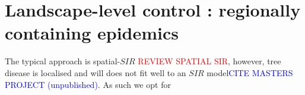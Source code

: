 



\chapter{Landscape-level control : regionally containing epidemics}
\label{ch7:pde}
The typical approach is spatial-$SIR$ \textcolor{red}{REVIEW SPATIAL SIR}, however, tree disease is localised and will does not fit well to an $SIR$ model\textcolor{blue}{CITE MASTERS PROJECT (unpublished)}. %
As such we opt for 

